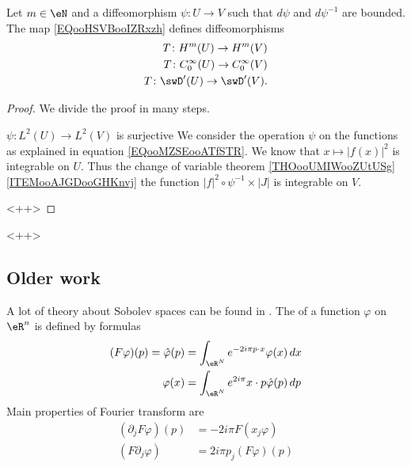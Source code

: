 \begin{proposition}
    Let \( m\in \eN\) and a diffeomorphism \( \psi\colon U\to V\) such that \( d\psi\) and \( d\psi^{-1}\) are bounded. The map \eqref{EQooHSVBooIZRxzh} defines diffeomorphisms
    \begin{subequations}
        \begin{align}
            T\colon H^m(U)\to H^m(V)\\
            T\colon  C^{\infty}_0(U)\to  C^{\infty}_0(V)\\
            T\colon \swD'(U)\to \swD'(V).
        \end{align}
    \end{subequations}
\end{proposition}

\begin{proof}
    We divide the proof in many steps.
    \begin{subproof}
    \item[\( \psi\colon L^2(U)\to L^2(V)\) is surjective] 
        We consider the operation \( \psi\) on the functions as explained in equation \eqref{EQooMZSEooATfSTR}. We know that \( x\mapsto | f(x) |^2\) is integrable on \( U\). Thus the change of variable theorem \ref{THOooUMIWooZUtUSg}\ref{ITEMooAJGDooGHKnvj} the function \( | f |^2\circ\psi^{-1}\times | J |\) is integrable on \( V\).
    \end{subproof}
    <++>
\end{proof}
<++>

\subsection{Older work}\label{subsec_Sobolev}

A lot of theory about Sobolev spaces can be found in \cite{Maslov,Taylor_PDO}. The  of a function $\varphi$ on $\eR^n$ is defined by formulas
\begin{subequations}
\begin{align}
  (F\varphi)(p)=\hat\varphi(p)&=\int_{\eR^N} e^{-2i\pi p\cdot x}\varphi(x)\,dx\\
	\varphi(x)&=\int_{\eR^{N}} e^{2i\pi}x\cdot p\hat\varphi(p)\,dp
\end{align}
\end{subequations}
Main properties of Fourier transform are
\begin{subequations} \label{subeq_prop_Four}
\begin{align}
(\partial_jF\varphi)(p)&=-2i\pi F(x_j\varphi)\\
	(F\partial_j\varphi)&=2i\pi p_j(F\varphi)(p)
\end{align}
\end{subequations}

